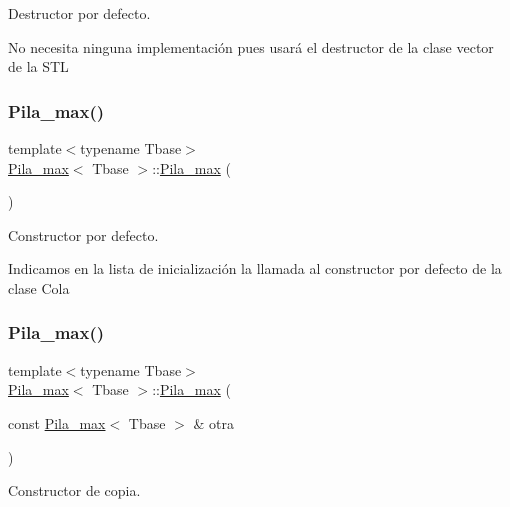 Destructor por defecto. 

No necesita ninguna implementación pues usará el destructor de la clase vector de la S\+TL \mbox{\label{classPila__max_a57b37a9e025685ae0c1ab172192dedb2}} 
\subsubsection{\texorpdfstring{Pila\+\_\+max()}{Pila\_max()}\hspace{0.1cm}{\footnotesize\ttfamily [3/4]}}
{\footnotesize\ttfamily template$<$typename Tbase$>$ \\
\hyperlink{classPila__max}{Pila\+\_\+max}$<$ Tbase $>$\+::\hyperlink{classPila__max}{Pila\+\_\+max} (\begin{DoxyParamCaption}{ }\end{DoxyParamCaption})\hspace{0.3cm}{\ttfamily [default]}}



Constructor por defecto. 

Indicamos en la lista de inicialización la llamada al constructor por defecto de la clase Cola \mbox{\label{classPila__max_ab5710c39c42d4d089736bba758c54f69}} 
\subsubsection{\texorpdfstring{Pila\+\_\+max()}{Pila\_max()}\hspace{0.1cm}{\footnotesize\ttfamily [4/4]}}
{\footnotesize\ttfamily template$<$typename Tbase$>$ \\
\hyperlink{classPila__max}{Pila\+\_\+max}$<$ Tbase $>$\+::\hyperlink{classPila__max}{Pila\+\_\+max} (\begin{DoxyParamCaption}\item[{const \hyperlink{classPila__max}{Pila\+\_\+max}$<$ Tbase $>$ \&}]{otra }\end{DoxyParamCaption})\hspace{0.3cm}{\ttfamily [inline]}}



Constructor de copia. 

